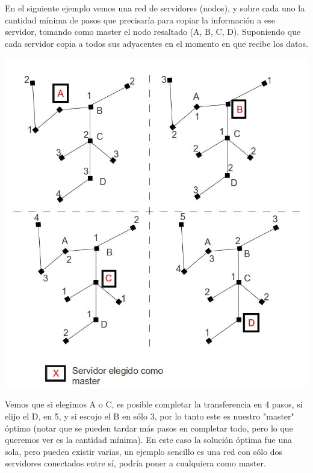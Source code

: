En el siguiente ejemplo vemos una red de servidores (nodos), y sobre cada uno la cantidad mínima de pasos que precisaría para copiar la información a ese servidor, tomando como master el nodo resaltado (A, B, C, D). Suponiendo que cada servidor copia a todos sus adyacentes en el momento en que recibe los datos.
\begin{center}
\includegraphics[scale=0.6]{ej2/imagen.png} 
\end{center}
Vemos que si elegimos A o C, es posible completar la transferencia en 4 pasos, si elijo el D, en 5, y si escojo el B en sólo 3, por lo tanto este es nuestro "master" óptimo (notar que se pueden tardar más pasos en completar todo, pero lo que queremos ver es la cantidad mínima).
En este caso la solución óptima fue una sola, pero pueden existir varias, un ejemplo sencillo es una red con sólo dos servidores conectados entre sí, podría poner a cualquiera como master.

